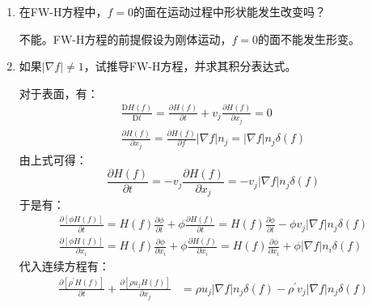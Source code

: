 \begin{enumerate}
    \item 在FW-H方程中，\(f = 0\)的面在运动过程中形状能发生改变吗？
    
        不能。FW-H方程的前提假设为刚体运动，\(f = 0\)的面不能发生形变。

    \item 如果\(|\nabla f| \neq 1\)，试推导FW-H方程，并求其积分表达式。
        
        对于表面，有：
        \begin{equation}
            \begin{aligned}
                \frac{\mathrm{D} H(f)}{\mathrm{D} t}
                =\frac{\partial H(f)}{\partial t}+v_{j} \frac{\partial H(f)}{\partial x_{j}}
                =0 \\
                \frac{\partial H(f)}{\partial x_{j}}
                =\frac{\partial H(f)}{\partial f} |\nabla f| n_{j}
                =|\nabla f| n_{j} \delta(f)
            \end{aligned}
        \end{equation}
        由上式可得：
        \begin{equation}
            \frac{\partial H(f)}{\partial t}
            =-v_{j} \frac{\partial H(f)}{\partial x_{j}}
            =-v_{j} |\nabla f| n_{j} \delta(f)
        \end{equation}
        于是有：
        \begin{equation}
            \begin{aligned}
                \frac{\partial[\phi H(f)]}{\partial t}
                =H(f) \frac{\partial \phi}{\partial t}+\phi \frac{\partial H(f)}{\partial t}
                =H(f) \frac{\partial \phi}{\partial t}-\phi v_{j} |\nabla f| n_{j} \delta(f) \\
                \frac{\partial[\phi H(f)]}{\partial x_{i}}
                =H(f) \frac{\partial \phi}{\partial x_{i}}+\phi \frac{\partial H(f)}{\partial x_{i}}
                =H(f) \frac{\partial \phi}{\partial x_{i}}+\phi |\nabla f| n_{i} \delta(f)
            \end{aligned}
        \end{equation}
        代入连续方程有：
        \begin{equation}
            \begin{aligned}
                \frac{\partial\left[\rho^{\prime} H(f)\right]}{\partial t}+\frac{\partial\left[\rho u_{j} H(f)\right]}{\partial x_{j}} 
                &=\rho u_{j} |\nabla f| n_{j} \delta(f)-\rho^{\prime} v_{j} |\nabla f| n_{j} \delta(f) \\

\end{aligned}
\end{equation}
\end{enumerate}
